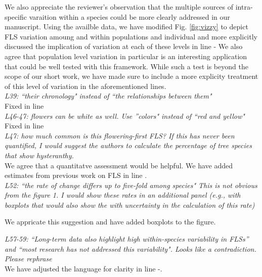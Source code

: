 \documentclass{article}[11pt]
\begin{document}
\indent We also appreciate the reviewer's observation that the multiple sources of intra-specific varaition within a species could be more clearly addressed in our manuscript. Using the availble data, we have modified Fig. \ref{fig:vizzy} to depict FLS variation amoung and within populations and individual and more explicitly discussed the implication of variation at each of these levels in line -  We also agree that population level variation in particular is an interesting application that could be well tested with this framework. While such a test is beyond the scope of our short work, we have made sure to include a more explicity treatment of this level of variation in the aforementioned lines.\\

\emph{L39: ``their chronology" instead of ``the relationships between them"}\\

Fixed in line \\

\emph{L46-47: flowers can be white as well. Use ''colors" instead of ``red and yellow"}\\

Fixed in line \\

\emph{L47: how much common is this flowering-first FLS? If this has never been quantified, I would suggest the authors to calculate the percentage of tree species that show hysteranthy.}\\

\noindent We agree that a quantitatve assessment would be helpful. We have added estimates from previous work on FLS \citep{Gougerthy2018} in line .\\

\emph{L52: ``the rate of change differs up to five-fold among species" This is not obvious from the figure 1. I would show these rates in an additional panel (e.g., with boxplots that would also show the with uncertainty in the calculation of this rate)}

\noindent We appricate this suggestion and have added boxplots to the figure.

\emph{L57-59: ``Long-term data also highlight high within-species variability in FLSs” and “most research has not addressed this variability". Looks like a contradiction. Please rephrase}\\

\noindent  We have adjusted the language for clarity in line -.\\
\end{document}
